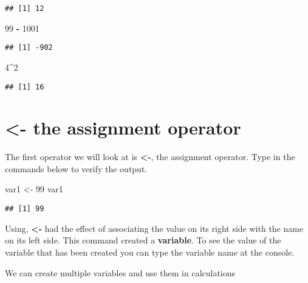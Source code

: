 \documentclass[]{book}
\newenvironment{Shaded}{\begin{snugshade}}{\end{snugshade}}
\newcommand{\DecValTok}[1]{\textcolor[rgb]{0.00,0.00,0.81}{#1}}
\newcommand{\NormalTok}[1]{#1}
\newcommand{\OperatorTok}[1]{\textcolor[rgb]{0.81,0.36,0.00}{\textbf{#1}}}
\newcommand{\StringTok}[1]{\textcolor[rgb]{0.31,0.60,0.02}{#1}}
\begin{document}
\begin{verbatim}
## [1] 12
\end{verbatim}

\begin{Shaded}
\begin{Highlighting}[]
\DecValTok{99} \OperatorTok{-}\StringTok{ }\DecValTok{1001}
\end{Highlighting}
\end{Shaded}

\begin{verbatim}
## [1] -902
\end{verbatim}

\begin{Shaded}
\begin{Highlighting}[]
\DecValTok{4}\OperatorTok{^}\DecValTok{2}
\end{Highlighting}
\end{Shaded}

\begin{verbatim}
## [1] 16
\end{verbatim}

\hypertarget{assignmentop}{%
\section*{\texorpdfstring{\textbf{\textless{}-} the assignment operator}{\textless{}- the assignment operator}}\label{assignmentop}}

The first operator we will look at is \textbf{\textless{}-}, the assignment operator. Type in the commands below to verify the output.

\begin{Shaded}
\begin{Highlighting}[]
\NormalTok{var1 <-}\StringTok{ }\DecValTok{99}
\NormalTok{var1}
\end{Highlighting}
\end{Shaded}

\begin{verbatim}
## [1] 99
\end{verbatim}

Using, \textbf{\textless{}-} had the effect of associating the value on its right side with the name on its left side. This command created a \textbf{variable}. To see the value of the variable that has been created you can type the variable name at the console.

We can create multiple variables and use them in calculations
\end{document}
